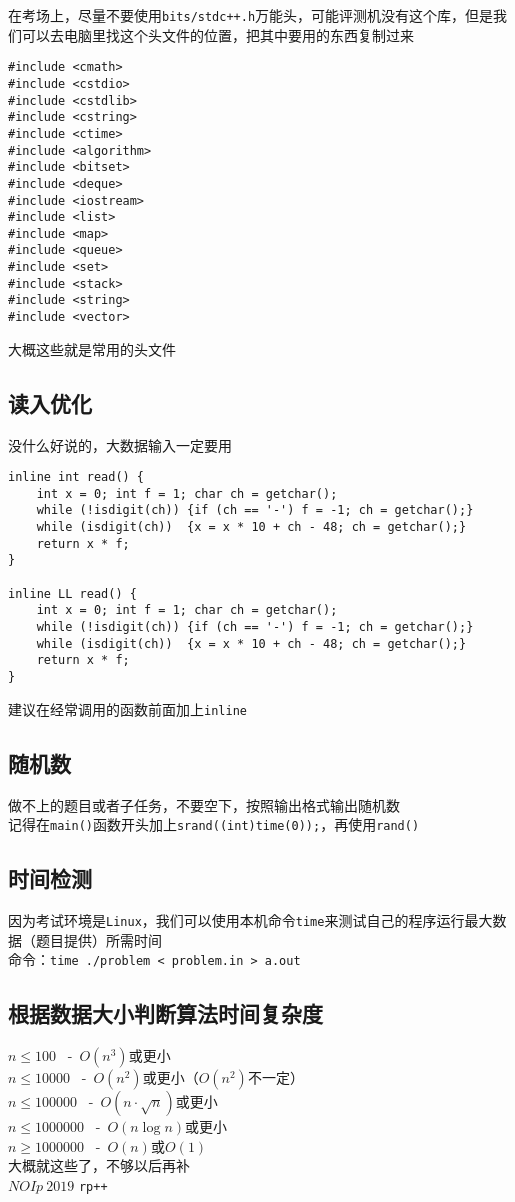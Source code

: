 \documentclass[UTF8]{ctexart}
\begin{document}
在考场上，尽量不要使用\texttt{bits/stdc++.h}万能头，可能评测机没有这个库，但是我们可以去电脑里找这个头文件的位置，把其中要用的东西复制过来

\begin{lstlisting}
#include <cmath>
#include <cstdio>
#include <cstdlib>
#include <cstring>
#include <ctime>
#include <algorithm>
#include <bitset>
#include <deque>
#include <iostream>
#include <list>
#include <map>
#include <queue>
#include <set>
#include <stack>
#include <string>
#include <vector>
\end{lstlisting}

大概这些就是常用的头文件

\subsection{读入优化}

没什么好说的，大数据输入一定要用

\begin{lstlisting}
inline int read() {
    int x = 0; int f = 1; char ch = getchar();
    while (!isdigit(ch)) {if (ch == '-') f = -1; ch = getchar();}
    while (isdigit(ch))  {x = x * 10 + ch - 48; ch = getchar();}
    return x * f;
}

inline LL read() {
    int x = 0; int f = 1; char ch = getchar();
    while (!isdigit(ch)) {if (ch == '-') f = -1; ch = getchar();}
    while (isdigit(ch))  {x = x * 10 + ch - 48; ch = getchar();}
    return x * f;
}
\end{lstlisting}

建议在经常调用的函数前面加上\texttt{inline}

\subsection{随机数}

做不上的题目或者子任务，不要空下，按照输出格式输出随机数\\
记得在\texttt{main()}函数开头加上\texttt{srand((int)time(0));}，再使用\texttt{rand()}

\subsection{时间检测}

因为考试环境是\texttt{Linux}，我们可以使用本机命令\texttt{time}来测试自己的程序运行最大数据（题目提供）所需时间\\
命令：\texttt{time ./problem < problem.in > a.out}

\subsection{根据数据大小判断算法时间复杂度}

\noindent$n\leq 100$ \ -\  $O(n^3)$或更小\\
$n\leq 10000$ \ -\  $O(n^2)$或更小（$O(n^2)$不一定）\\
$n\leq 100000$ \ -\  $O(n\cdot \sqrt{n})$或更小\\
$n\leq 1000000$ \ -\  $O(n\log n)$或更小\\
$n\geq 1000000$ \ -\ $O(n)$或$O(1)$ \\


大概就这些了，不够以后再补\\

{\Huge $NOIp\ 2019$ \texttt{rp++}}
\end{document}
